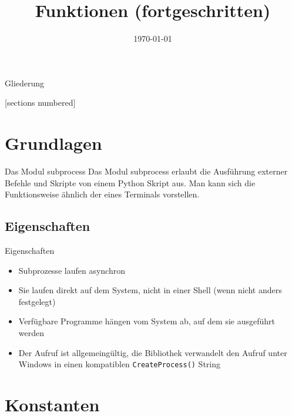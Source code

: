 



\title{Funktionen (fortgeschritten)}
\date{\today}




\maketitle

\begin{frame}{Gliederung}
        \begin{multicols}{2}
                [sections numbered]
                \tableofcontents
        \end{multicols}
\end{frame}


\section{Grundlagen}
\begin{frame}[fragile]{Das Modul subprocess}
	Das Modul \alert{subprocess} erlaubt die Ausf\"uhrung externer Befehle und
	Skripte von einem Python Skript aus. Man kann sich die Funktionsweise \"ahnlich
	der eines Terminals vorstellen.
\end{frame}


\subsection{Eigenschaften}
\begin{frame}[fragile]{Eigenschaften}
	\begin{itemize}
		\item Subprozesse laufen \alert{asynchron}
		\item Sie laufen direkt auf dem System, nicht in einer Shell
		(wenn nicht anders festgelegt)
		\item Verf\"ugbare Programme h\"angen vom System ab, auf dem sie ausgef\"uhrt werden
		\item Der Aufruf ist allgemeing\"ultig, die Bibliothek verwandelt den
		Aufruf unter Windows in einen kompatiblen \texttt{CreateProcess()} String
	\end{itemize}
\end{frame}


\section{Konstanten}
